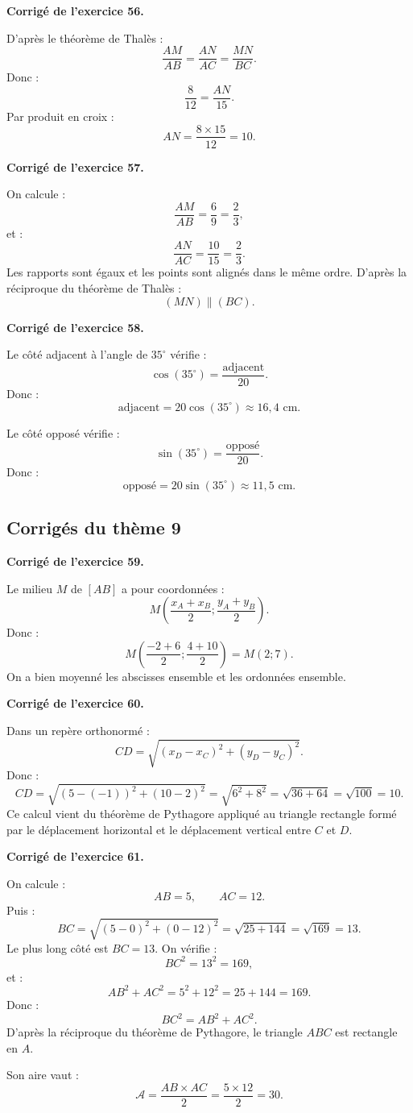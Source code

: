\documentclass[11pt,a4paper]{article}
\newcounter{exercice}
\newenvironment{corrige}[1][]
{\par\medskip\noindent\textbf{Corrigé de l'exercice #1.}\par\smallskip}
{\medskip}
\begin{document}
\begin{corrige}[56]
D'après le théorème de Thalès :
\[
\frac{AM}{AB}=\frac{AN}{AC}=\frac{MN}{BC}.
\]
Donc :
\[
\frac{8}{12}=\frac{AN}{15}.
\]
Par produit en croix :
\[
AN=\frac{8\times15}{12}=10.
\]
\end{corrige}

\begin{corrige}[57]
On calcule :
\[
\frac{AM}{AB}=\frac{6}{9}=\frac{2}{3},
\]
et :
\[
\frac{AN}{AC}=\frac{10}{15}=\frac{2}{3}.
\]
Les rapports sont égaux et les points sont alignés dans le même ordre. D'après la réciproque du théorème de Thalès :
\[
(MN)\parallel(BC).
\]
\end{corrige}

\begin{corrige}[58]
Le côté adjacent à l'angle de $35^\circ$ vérifie :
\[
\cos(35^\circ)=\frac{\text{adjacent}}{20}.
\]
Donc :
\[
\text{adjacent}=20\cos(35^\circ)\approx16,4\text{ cm}.
\]

Le côté opposé vérifie :
\[
\sin(35^\circ)=\frac{\text{opposé}}{20}.
\]
Donc :
\[
\text{opposé}=20\sin(35^\circ)\approx11,5\text{ cm}.
\]
\end{corrige}

\subsection*{Corrigés du thème 9}

\begin{corrige}[59]
Le milieu $M$ de $[AB]$ a pour coordonnées :
\[
M\left(\frac{x_A+x_B}{2};\frac{y_A+y_B}{2}\right).
\]
Donc :
\[
M\left(\frac{-2+6}{2};\frac{4+10}{2}\right)
=
M(2;7).
\]
On a bien moyenné les abscisses ensemble et les ordonnées ensemble.
\end{corrige}

\begin{corrige}[60]
Dans un repère orthonormé :
\[
CD=\sqrt{(x_D-x_C)^2+(y_D-y_C)^2}.
\]
Donc :
\[
CD=\sqrt{(5-(-1))^2+(10-2)^2}
=\sqrt{6^2+8^2}
=\sqrt{36+64}
=\sqrt{100}
=10.
\]
Ce calcul vient du théorème de Pythagore appliqué au triangle rectangle formé par le déplacement horizontal et le déplacement vertical entre $C$ et $D$.
\end{corrige}

\begin{corrige}[61]
On calcule :
\[
AB=5,
\qquad
AC=12.
\]
Puis :
\[
BC=\sqrt{(5-0)^2+(0-12)^2}
=\sqrt{25+144}
=\sqrt{169}
=13.
\]
Le plus long côté est $BC=13$. On vérifie :
\[
BC^2=13^2=169,
\]
et :
\[
AB^2+AC^2=5^2+12^2=25+144=169.
\]
Donc :
\[
BC^2=AB^2+AC^2.
\]
D'après la réciproque du théorème de Pythagore, le triangle $ABC$ est rectangle en $A$.

Son aire vaut :
\[
\mathcal A=\frac{AB\times AC}{2}
=\frac{5\times12}{2}
=30.
\]
\end{corrige}
\end{document}
